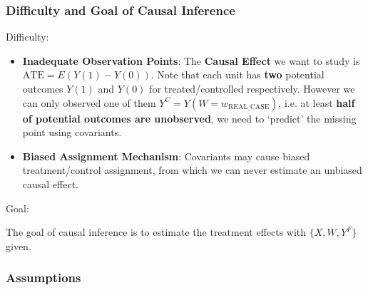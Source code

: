     

\subsubsection{Difficulty and Goal of Causal Inference}
\begin{point}
    Difficulty:
\end{point}
\begin{itemize}[topsep=2pt,itemsep=0pt]
    \item \textbf{Inadequate Observation Points}: The \textbf{Causal Effect} we want to study is $ \mathrm{ATE}=E(Y(1)-Y(0))  $. Note that each unit has \textbf{two} potential outcomes $ Y(1) $ and $ Y(0) $ for treated/controlled respectively. However we can only observed one of them $ Y^C=Y(W=w_\mathrm{REAL\_CASE} ) $, i.e. at least \textbf{half of potential outcomes are unobserved}, we need to `predict' the missing point using covariants.
    \item \textbf{Biased Assignment Mechanism}: Covariants may cause biased treatment/control assignment, from which we can never estimate an unbiased causal effect.
\end{itemize}

\begin{point}
    Goal:
\end{point}

    The goal of causal inference is to estimate the treatment effects with $ \{X,W,Y^F\} $ given.


\subsubsection{Assumptions}

